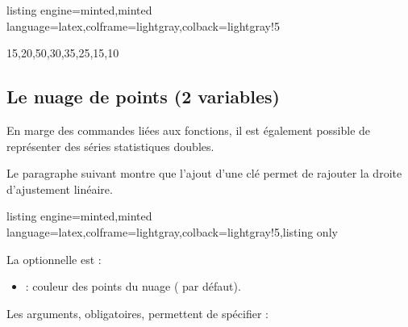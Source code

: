 \documentclass[11pt,a4paper]{ltxdoc}
\begin{document}
\begin{tcblisting}{listing engine=minted,minted language=latex,colframe=lightgray,colback=lightgray!5}
\begin{GraphiqueTikz}[x=0.15cm,y=0.03cm,Xmin=0,Xmax=75,Xgrille=10,Xgrilles=5,
  Ymin=0,Ymax=200,Ygrille=20,Ygrilles=10]
    {15,20,50,30,35,25,15,10}
\end{GraphiqueTikz}

\end{tcblisting}

\subsection{Le nuage de points (2 variables)}\label{nuage}

En marge des commandes liées aux fonctions, il est également possible de représenter des séries statistiques doubles.

\smallskip

Le paragraphe suivant montre que l'ajout d'une clé permet de rajouter la droite d'ajustement linéaire.

\begin{tcblisting}{listing engine=minted,minted language=latex,colframe=lightgray,colback=lightgray!5,listing only}
\end{tcblisting}

La \MontreCode{[clé]} optionnelle est :

\smallskip

\begin{itemize}
  \item {} : couleur des points du nuage ( par défaut).
\end{itemize}

\smallskip

Les arguments, obligatoires, permettent de spécifier :
\end{document}
